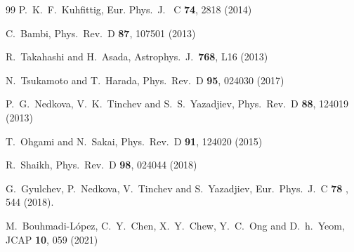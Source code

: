 \documentclass[11pt,a4paper]{article}
\begin{document}
\begin{thebibliography}{99}
  P.~K.~F.~Kuhfittig,
  Eur. Phys.\ J. \ C {\bf 74},  2818 (2014)
 
  C.~Bambi,
  Phys.\ Rev.\ D {\bf 87}, 107501 (2013)

  R.~Takahashi and H.~Asada,
  Astrophys.\ J.\  {\bf 768}, L16 (2013)

  N.~Tsukamoto and T.~Harada,
  Phys.\ Rev.\ D {\bf 95},   024030 (2017)

  P.~G.~Nedkova, V.~K.~Tinchev and S.~S.~Yazadjiev,
  Phys.\ Rev.\ D {\bf 88},   124019 (2013)

  T.~Ohgami and N.~Sakai,
  Phys.\ Rev.\ D {\bf 91}, 124020 (2015)

  R.~Shaikh,
  Phys.\ Rev.\ D {\bf 98},  024044 (2018)
 

  G.~Gyulchev, P.~Nedkova, V.~Tinchev and S.~Yazadjiev,
  Eur.\ Phys.\ J.\ C {\bf 78} , 544 (2018).


M.~Bouhmadi-L\'opez, C.~Y.~Chen, X.~Y.~Chew, Y.~C.~Ong and D.~h.~Yeom,
JCAP \textbf{10}, 059 (2021)


\end{thebibliography}
\end{document}
